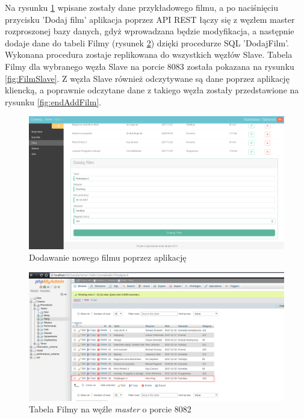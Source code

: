 Na rysunku \ref{fig:addFilm} wpisane zostały dane przykładowego filmu, a po naciśnięciu przycisku 'Dodaj film' aplikacja poprzez API REST łączy się z węzłem master rozproszonej bazy danych, gdyż wprowadzana będzie modyfikacja, a następnie dodaje dane do tabeli Filmy (rysunek \ref{fig:FilmMaster}) dzięki procedurze SQL 'DodajFilm'. Wykonana procedura zostaje replikowana do wszystkich węzłów Slave. Tabela Filmy dla wybranego węzła Slave na porcie 8083 została pokazana na rysunku \ref{fig:FilmSlave}. Z węzła Slave również odczytywane są dane poprzez aplikację kliencką, a poprawnie odczytane dane z takiego węzła zostały przedstawione na rysunku \ref{fig:endAddFilm}.

\begin{figure} [H]
	\centering
	\includegraphics[width=1\linewidth]{rozdzial06/5.png}
	\caption{Dodawanie nowego filmu poprzez aplikację}
	\label{fig:addFilm}
\end{figure}

\begin{figure} [H]
	\centering
	\includegraphics[width=1\linewidth]{rozdzial06/7.png}
	\caption{Tabela Filmy na węźle \textit{master} o porcie 8082}
	\label{fig:FilmMaster}
\end{figure}

